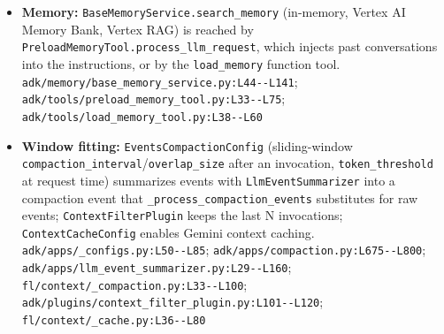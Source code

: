 \begin{itemize}
\item \textbf{Memory:} \texttt{BaseMemoryService.\allowbreak{}search\_\allowbreak{}memory} (in-memory, Vertex AI Memory Bank, Vertex RAG) is reached by \texttt{PreloadMemoryTool.\allowbreak{}process\_\allowbreak{}llm\_\allowbreak{}request}, which injects past conversations into the instructions, or by the \texttt{load\_\allowbreak{}memory} function tool. \texttt{adk/\allowbreak{}memory/\allowbreak{}base\_\allowbreak{}memory\_\allowbreak{}service.\allowbreak{}py:\allowbreak{}L44-\allowbreak{}-\allowbreak{}L141}; \texttt{adk/\allowbreak{}tools/\allowbreak{}preload\_\allowbreak{}memory\_\allowbreak{}tool.\allowbreak{}py:\allowbreak{}L33-\allowbreak{}-\allowbreak{}L75}; \texttt{adk/\allowbreak{}tools/\allowbreak{}load\_\allowbreak{}memory\_\allowbreak{}tool.\allowbreak{}py:\allowbreak{}L38-\allowbreak{}-\allowbreak{}L60}
\item \textbf{Window fitting:} \texttt{EventsCompactionConfig} (sliding-window \texttt{compaction\_\allowbreak{}interval}/\texttt{overlap\_\allowbreak{}size} after an invocation, \texttt{token\_\allowbreak{}threshold} at request time) summarizes events with \texttt{LlmEventSummarizer} into a compaction event that \texttt{\_\allowbreak{}process\_\allowbreak{}compaction\_\allowbreak{}events} substitutes for raw events; \texttt{ContextFilterPlugin} keeps the last N invocations; \texttt{ContextCacheConfig} enables Gemini context caching. \texttt{adk/\allowbreak{}apps/\allowbreak{}\_\allowbreak{}configs.\allowbreak{}py:\allowbreak{}L50-\allowbreak{}-\allowbreak{}L85}; \texttt{adk/\allowbreak{}apps/\allowbreak{}compaction.\allowbreak{}py:\allowbreak{}L675-\allowbreak{}-\allowbreak{}L800}; \texttt{adk/\allowbreak{}apps/\allowbreak{}llm\_\allowbreak{}event\_\allowbreak{}summarizer.\allowbreak{}py:\allowbreak{}L29-\allowbreak{}-\allowbreak{}L160}; \texttt{fl/\allowbreak{}context/\allowbreak{}\_\allowbreak{}compaction.\allowbreak{}py:\allowbreak{}L33-\allowbreak{}-\allowbreak{}L100}; \texttt{adk/\allowbreak{}plugins/\allowbreak{}context\_\allowbreak{}filter\_\allowbreak{}plugin.\allowbreak{}py:\allowbreak{}L101-\allowbreak{}-\allowbreak{}L120}; \texttt{fl/\allowbreak{}context/\allowbreak{}\_\allowbreak{}cache.\allowbreak{}py:\allowbreak{}L36-\allowbreak{}-\allowbreak{}L80}
\end{itemize}

